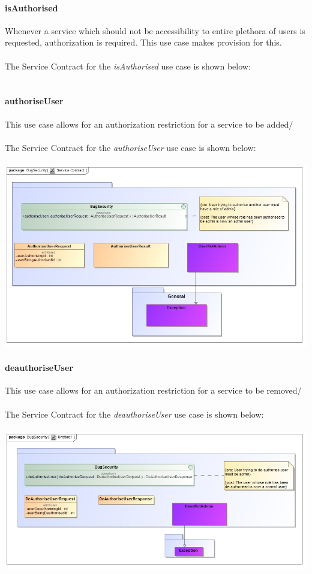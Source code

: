\documentclass[11pt,a4paper,titlepage]{article}
\begin{document}
		\paragraph{isAuthorised }
		Whenever a service which should not be accessibility to entire plethora of users is requested, authorization is required. This use case makes provision for this.\\\hfill\\
		The Service Contract for the \textit{isAuthorised} use case is shown below:\\\hfill\\
		\paragraph{authoriseUser }
		This use case allows for an authorization restriction for a service to be added/\\\hfill\\
		The Service Contract for the \textit{authoriseUser} use case is shown below:\\\hfill\\
		\includegraphics[width=\linewidth]{authorise}
		\paragraph{deauthoriseUser }
				This use case allows for an authorization restriction for a service to be removed/\\\hfill\\
		The Service Contract for the \textit{deauthoriseUser} use case is shown below:\\\hfill\\
		\includegraphics[width=\linewidth]{deauthor}
		
\end{document}
